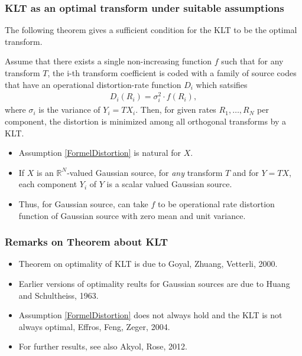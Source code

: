 \begin{frame}\frametitle{KLT as an optimal transform under suitable assumptions} 
The following theorem gives a sufficient condition for the KLT to be the optimal transform.
\begin{theorem}
Assume that there exists a single non-increasing function $f$ such that for any transform $T$, the i-th transform coefficient is coded 
with a family of source codes that have an operational distortion-rate function $D_i$ which satsifies
\begin{align}\label{FormelDistortion}
D_i(R_i)=\sigma_i^2\cdot f(R_i),
\end{align}
where $\sigma_i$ is the variance of $Y_i=TX_i$. Then, for given rates $R_1,\dots,R_N$ per component, the 
distortion is minimized among all orthogonal transforms by a KLT. 
\end{theorem}
\begin{itemize}
\item Assumption \eqref{FormelDistortion} is natural for  $X$.
\item If $X$ is an $\mathbb{R}^N$-valued Gaussian source, for \textit{any} transform $T$ and for $Y=TX$, each component 
$Y_i$ of $Y$ is a scalar valued Gaussian source. 
\item Thus, for Gaussian source, can take $f$ to be operational rate distortion function of Gaussian source with zero mean and unit 
variance.  
\end{itemize}
\end{frame}

\begin{frame}\frametitle{Remarks on Theorem about KLT}
\begin{itemize}
\item Theorem on optimality of KLT is due to Goyal, Zhuang, Vetterli, 2000.
\item Earlier versions of optimality reults for Gaussian sources are due to Huang and Schultheiss, 1963.
\item Assumption \eqref{FormelDistortion} does not always hold and the KLT is not always optimal, Effros, Feng, Zeger, 2004.
\item For further results, see also Akyol, Rose, 2012.
\end{itemize}
\end{frame}

